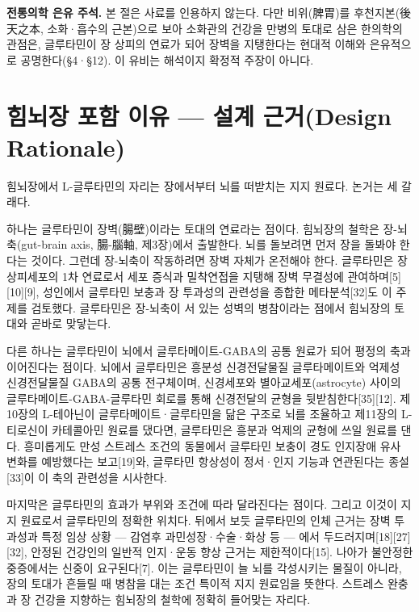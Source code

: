 \documentclass[12pt,oneside]{book}
\newenvironment{authnote}
  {\par\smallskip\begingroup\leftskip=6mm\rightskip=3mm\small\color{muted}\noindent\ignorespaces}
  {\par\endgroup\smallskip}
\begin{document}
\begin{authnote}\textbf{전통의학 은유 주석.} 본 절은 사료를 인용하지 않는다. 다만 비위(脾胃)를 후천지본(後天之本, 소화·흡수의 근본)으로 보아 소화관의 건강을 만병의 토대로 삼은 한의학의 관점은, 글루타민이 장 상피의 연료가 되어 장벽을 지탱한다는 현대적 이해와 은유적으로 공명한다(§4·§12). 이 유비는 해석이지 확정적 주장이 아니다.\end{authnote}

\section{힘뇌장 포함 이유 — 설계 근거(Design Rationale)}

힘뇌장에서 L-글루타민의 자리는 장에서부터 뇌를 떠받치는 지지 원료다. 논거는 세 갈래다.

하나는 글루타민이 장벽(腸壁)이라는 토대의 연료라는 점이다. 힘뇌장의 철학은 장-뇌축(gut-brain axis, 腸-腦軸, 제3장)에서 출발한다. 뇌를 돌보려면 먼저 장을 돌봐야 한다는 것이다. 그런데 장-뇌축이 작동하려면 장벽 자체가 온전해야 한다. 글루타민은 장 상피세포의 1차 연료로서 세포 증식과 밀착연접을 지탱해 장벽 무결성에 관여하며[5][10][9], 성인에서 글루타민 보충과 장 투과성의 관련성을 종합한 메타분석[32]도 이 주제를 검토했다. 글루타민은 장-뇌축이 서 있는 성벽의 병참이라는 점에서 힘뇌장의 토대와 곧바로 맞닿는다.

다른 하나는 글루타민이 뇌에서 글루타메이트-GABA의 공통 원료가 되어 평정의 축과 이어진다는 점이다. 뇌에서 글루타민은 흥분성 신경전달물질 글루타메이트와 억제성 신경전달물질 GABA의 공통 전구체이며, 신경세포와 별아교세포(astrocyte) 사이의 글루타메이트-GABA-글루타민 회로를 통해 신경전달의 균형을 뒷받침한다[35][12]. 제10장의 L-테아닌이 글루타메이트·글루타민을 닮은 구조로 뇌를 조율하고 제11장의 L-티로신이 카테콜아민 원료를 댔다면, 글루타민은 흥분과 억제의 균형에 쓰일 원료를 댄다. 흥미롭게도 만성 스트레스 조건의 동물에서 글루타민 보충이 경도 인지장애 유사 변화를 예방했다는 보고[19]와, 글루타민 항상성이 정서·인지 기능과 연관된다는 종설[33]이 이 축의 관련성을 시사한다.

마지막은 글루타민의 효과가 부위와 조건에 따라 달라진다는 점이다. 그리고 이것이 지지 원료로서 글루타민의 정확한 위치다. 뒤에서 보듯 글루타민의 인체 근거는 장벽 투과성과 특정 임상 상황 — 감염후 과민성장·수술·화상 등 — 에서 두드러지며[18][27][32], 안정된 건강인의 일반적 인지·운동 향상 근거는 제한적이다[15]. 나아가 불안정한 중증에서는 신중이 요구된다[7]. 이는 글루타민이 늘 뇌를 각성시키는 물질이 아니라, 장의 토대가 흔들릴 때 병참을 대는 조건 특이적 지지 원료임을 뜻한다. 스트레스 완충과 장 건강을 지향하는 힘뇌장의 철학에 정확히 들어맞는 자리다.
\end{document}
